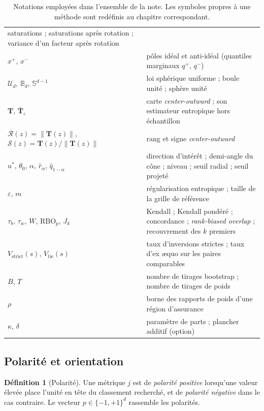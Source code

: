 \documentclass[11pt,a4paper]{article}
\theoremstyle{definition}
\newtheorem{definition}{Définition}[section]
\theoremstyle{remark}
\newcommand{\Unif}{\mathcal{U}}
\newcommand{\Bball}{\mathbb{B}}
\newcommand{\Sphere}{\mathbb{S}}
\newcommand{\norm}[1]{\left\lVert #1 \right\rVert}
\newcommand{\Tmap}{\mathbf{T}}
\begin{document}
\begin{table}[htbp]
\begin{tabularx}{\textwidth}{@{}l X@{}}
      saturations ; saturations après rotation ; variance d'un facteur après rotation \\
    $x^+$, $x^-$ & pôles idéal et anti-idéal (quantiles marginaux $q^+$, $q^-$) \\
    $\Unif_d$, $\Bball_d$, $\Sphere^{d-1}$ & loi sphérique uniforme ; boule unité ;
      sphère unité \\
    $\Tmap$, $\bar{\Tmap}_\varepsilon$ & carte \emph{center-outward} ; son estimateur
      entropique hors échantillon \\
    $\mathcal{R}(z) = \norm{\Tmap(z)}$, $\mathcal{S}(z) = \Tmap(z)/\norm{\Tmap(z)}$ &
      rang et signe \emph{center-outward} \\
    $u^*$, $\theta_0$, $\alpha$, $\hat{r}_\alpha$, $\hat{q}_{1-\alpha}$ & direction
      d'intérêt ; demi-angle du cône ; niveau ; seuil radial ; seuil projeté \\
    $\varepsilon$, $m$ & régularisation entropique ; taille de la grille de référence \\
    $\tau_b$, $\tau_w$, $W$, $\mathrm{RBO}_p$, $J_k$ & Kendall ; Kendall pondéré ;
      concordance ; \emph{rank-biased overlap} ; recouvrement des $k$ premiers \\
    $V_{\mathrm{strict}}(s)$, $V_{\mathrm{tie}}(s)$ & taux d'inversions strictes ; taux
      d'ex \ae quo sur les paires comparables \\
    $B$, $T$ & nombre de tirages bootstrap ; nombre de tirages de poids \\
    $\rho$ & borne des rapports de poids d'une région d'assurance \\
    $\kappa$, $\delta$ & paramètre de parts ; plancher additif (option) \\
    \bottomrule
  \end{tabularx}
  \caption{Notations employées dans l'ensemble de la note. Les symboles propres à une
  méthode sont redéfinis au chapitre correspondant.}
  \label{tab:notations}
\end{table}

\bigskip

\subsection{Polarité et orientation}

\medskip

\begin{definition}[Polarité]
  \label{def:polarite}
  Une métrique $j$ est de \emph{polarité positive} lorsqu'une valeur élevée place l'unité
  en tête du classement recherché, et de \emph{polarité négative} dans le cas contraire.
  Le vecteur $p \in \{-1,+1\}^d$ rassemble les polarités.
\end{definition}
\end{document}
